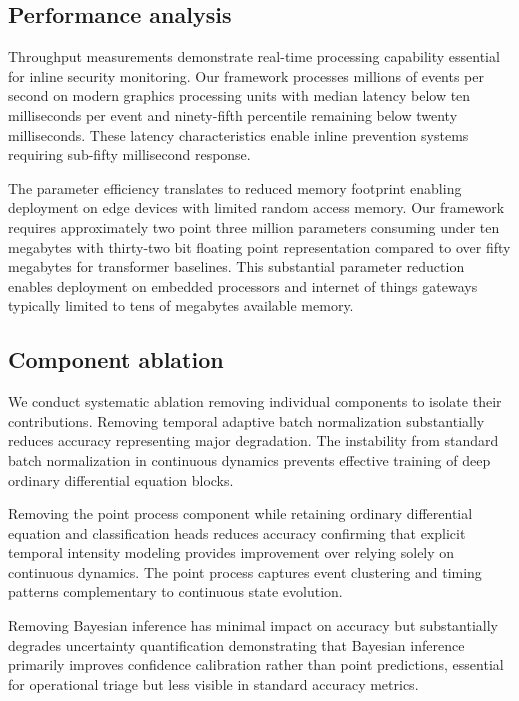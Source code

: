 \documentclass[10pt,journal,compsoc]{IEEEtran}
\begin{document}
\subsection{Performance analysis}

Throughput measurements demonstrate real-time processing capability essential for inline security monitoring. Our framework processes millions of events per second on modern graphics processing units with median latency below ten milliseconds per event and ninety-fifth percentile remaining below twenty milliseconds. These latency characteristics enable inline prevention systems requiring sub-fifty millisecond response.

The parameter efficiency translates to reduced memory footprint enabling deployment on edge devices with limited random access memory. Our framework requires approximately two point three million parameters consuming under ten megabytes with thirty-two bit floating point representation compared to over fifty megabytes for transformer baselines. This substantial parameter reduction enables deployment on embedded processors and internet of things gateways typically limited to tens of megabytes available memory.

\subsection{Component ablation}

We conduct systematic ablation removing individual components to isolate their contributions. Removing temporal adaptive batch normalization substantially reduces accuracy representing major degradation. The instability from standard batch normalization in continuous dynamics prevents effective training of deep ordinary differential equation blocks.

Removing the point process component while retaining ordinary differential equation and classification heads reduces accuracy confirming that explicit temporal intensity modeling provides improvement over relying solely on continuous dynamics. The point process captures event clustering and timing patterns complementary to continuous state evolution.

Removing Bayesian inference has minimal impact on accuracy but substantially degrades uncertainty quantification demonstrating that Bayesian inference primarily improves confidence calibration rather than point predictions, essential for operational triage but less visible in standard accuracy metrics.
\end{document}
